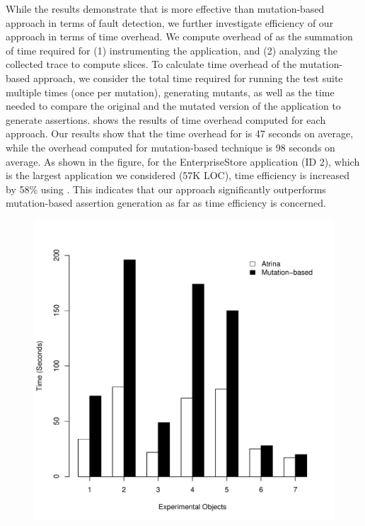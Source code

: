 While the results demonstrate that \atrina is more effective than mutation-based approach in terms of fault detection, we further investigate efficiency of our approach in terms of time overhead. 
We compute overhead of \atrina as the summation of time required for (1) instrumenting the application, and (2) analyzing the collected trace to compute \javascript slices. To calculate time overhead of the mutation-based approach, we consider the total time required for running the test suite multiple times (once per mutation), generating mutants, as well as the time needed to compare the original and the mutated version of the application to generate assertions.  shows the results of time overhead computed for each approach.    
Our results show that the time overhead for \atrina is 47 seconds on average, while the overhead computed for mutation-based technique is 98 seconds on average. As shown in the figure, for the EnterpriseStore application (ID 2), which is the largest application we considered (57K LOC), time efficiency is increased by 58\% using \atrina. This indicates that our approach significantly outperforms mutation-based assertion generation as far as time efficiency is concerned. 
\begin{figure}[!t]
  \centering
  \includegraphics[width=0.6\hsize]{r-scripts/performance}
  \vspace{0.2in}   
  \label{Fig:performance}   
\end{figure}